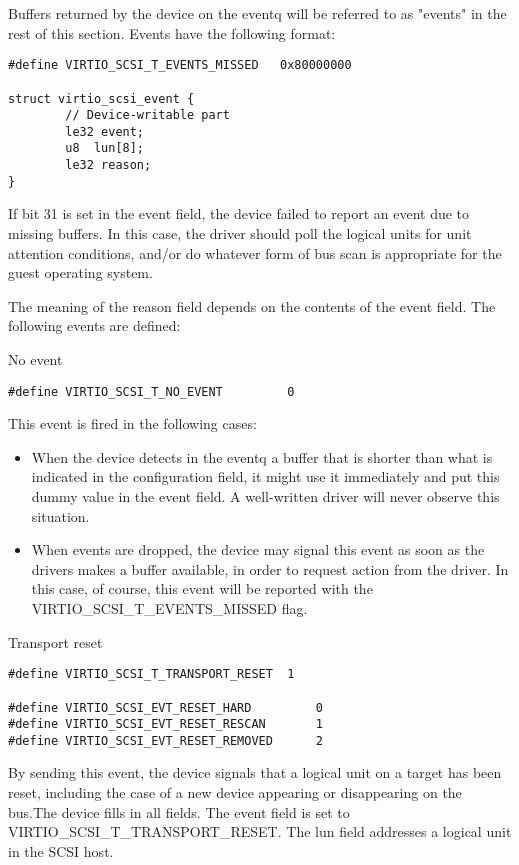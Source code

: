Buffers returned by the device on the eventq will be referred to
as "events" in the rest of this section. Events have the
following format:

\begin{lstlisting}
#define VIRTIO_SCSI_T_EVENTS_MISSED   0x80000000

struct virtio_scsi_event {
        // Device-writable part
        le32 event;
        u8  lun[8];
        le32 reason;
}
\end{lstlisting}

If bit 31 is set in the event field, the device failed to report
an event due to missing buffers. In this case, the driver should
poll the logical units for unit attention conditions, and/or do
whatever form of bus scan is appropriate for the guest operating
system.

The meaning of the reason field depends on the
contents of the event field. The following events are defined:

  No event
\begin{lstlisting}
#define VIRTIO_SCSI_T_NO_EVENT         0
\end{lstlisting}

  This event is fired in the following cases:

\begin{itemize}
\item When the device detects in the eventq a buffer that is
    shorter than what is indicated in the configuration field, it
    might use it immediately and put this dummy value in the
    event field. A well-written driver will never observe this
    situation.

\item When events are dropped, the device may signal this event as
    soon as the drivers makes a buffer available, in order to
    request action from the driver. In this case, of course, this
    event will be reported with the VIRTIO_SCSI_T_EVENTS_MISSED
    flag.
\end{itemize}

  Transport reset
\begin{lstlisting}
#define VIRTIO_SCSI_T_TRANSPORT_RESET  1

#define VIRTIO_SCSI_EVT_RESET_HARD         0
#define VIRTIO_SCSI_EVT_RESET_RESCAN       1
#define VIRTIO_SCSI_EVT_RESET_REMOVED      2
\end{lstlisting}

  By sending this event, the device signals that a logical unit
  on a target has been reset, including the case of a new device
  appearing or disappearing on the bus.The device fills in all
  fields. The event field is set to
  VIRTIO_SCSI_T_TRANSPORT_RESET. The lun field addresses a
  logical unit in the SCSI host.

